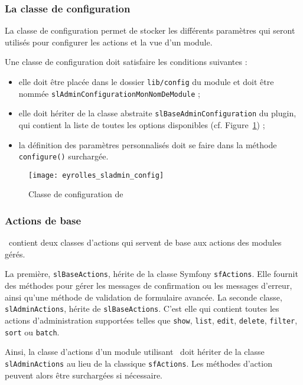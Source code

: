 \subsubsection{La classe de configuration}

La classe de configuration permet de stocker les différents paramètres qui seront utilisés pour configurer les actions et la vue d'un module.

Une classe de configuration doit satisfaire les conditions suivantes :
\begin{itemize}
	\item elle doit être placée dans le dossier \texttt{lib/config} du module et doit être nommée \texttt{slAdminConfigurationMonNomDeModule} ;
	\item elle doit hériter de la classe abstraite \texttt{slBaseAdminConfiguration} du plugin, qui contient la liste de toutes les options disponibles (cf. Figure~\ref{figure:eyrolles_sladmin_config}) ;
	\item la définition des paramètres personnalisés doit se faire dans la méthode \texttt{configure()} surchargée.
\end{itemize}

\begin{figure}
	\centering
	\texttt{[image: eyrolles\_sladmin\_config]}
	\caption{Classe de configuration de \asladmin}
	\label{figure:eyrolles_sladmin_config}
\end{figure}


\subsubsection{Actions de base}

\asladmin\ contient deux classes d'actions qui servent de base aux actions des modules gérés.

La première, \texttt{slBaseActions}, hérite de la classe Symfony \texttt{sfActions}. Elle fournit des méthodes pour gérer les messages de confirmation ou les messages d'erreur, ainsi qu'une méthode de validation de formulaire avancée. La seconde classe, \texttt{slAdminActions}, hérite de \texttt{slBaseActions}. C'est elle qui contient toutes les actions d'administration supportées telles que \texttt{show}, \texttt{list}, \texttt{edit}, \texttt{delete}, \texttt{filter}, \texttt{sort} ou \texttt{batch}.

Ainsi, la classe d'actions d'un module utilisant \asladmin\ doit hériter de la classe \texttt{slAdminActions} au lieu de la classique \texttt{sfActions}. Les méthodes d'action peuvent alors être surchargées si nécessaire.

